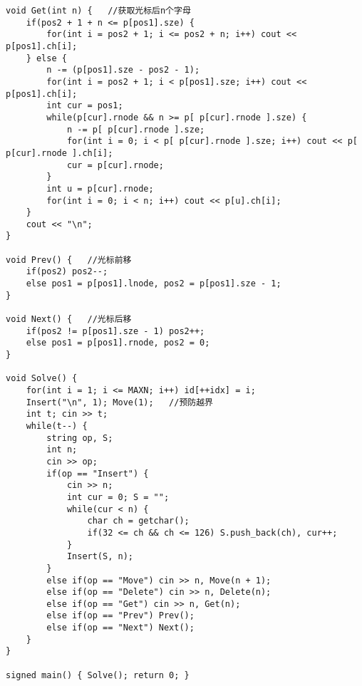\begin{lstlisting}
void Get(int n) {	//获取光标后n个字母
	if(pos2 + 1 + n <= p[pos1].sze) {
		for(int i = pos2 + 1; i <= pos2 + n; i++) cout << p[pos1].ch[i];
	} else {
		n -= (p[pos1].sze - pos2 - 1);
		for(int i = pos2 + 1; i < p[pos1].sze; i++) cout << p[pos1].ch[i];
		int cur = pos1;
		while(p[cur].rnode && n >= p[ p[cur].rnode ].sze) {
			n -= p[ p[cur].rnode ].sze;
			for(int i = 0; i < p[ p[cur].rnode ].sze; i++) cout << p[ p[cur].rnode ].ch[i];
			cur = p[cur].rnode;
		}
		int u = p[cur].rnode;
		for(int i = 0; i < n; i++) cout << p[u].ch[i];
	}
	cout << "\n";
}

void Prev() {	//光标前移
	if(pos2) pos2--;
	else pos1 = p[pos1].lnode, pos2 = p[pos1].sze - 1; 
}

void Next() {	//光标后移
	if(pos2 != p[pos1].sze - 1) pos2++;
	else pos1 = p[pos1].rnode, pos2 = 0;
}

void Solve() {
	for(int i = 1; i <= MAXN; i++) id[++idx] = i;
	Insert("\n", 1); Move(1);	//预防越界
	int t; cin >> t;
	while(t--) {
		string op, S;
		int n;
		cin >> op;
		if(op == "Insert") {
			cin >> n;
			int cur = 0; S = "";
			while(cur < n) {
				char ch = getchar();
				if(32 <= ch && ch <= 126) S.push_back(ch), cur++;
			}
			Insert(S, n);
		} 
		else if(op == "Move") cin >> n, Move(n + 1);
		else if(op == "Delete") cin >> n, Delete(n);
		else if(op == "Get") cin >> n, Get(n);
		else if(op == "Prev") Prev();
		else if(op == "Next") Next();	
	}
}

signed main() { Solve(); return 0; }
\end{lstlisting}



